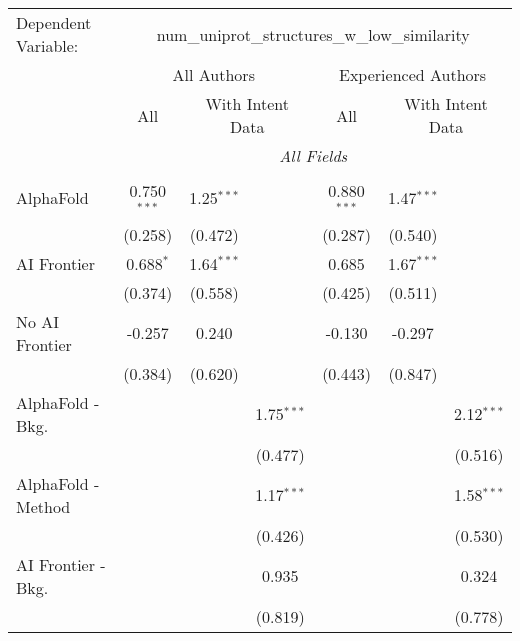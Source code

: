 \begingroup
\centering
\begin{tabular}{lcccccc}
   \tabularnewline \midrule \midrule
   Dependent Variable: & \multicolumn{6}{c}{num\_uniprot\_structures\_w\_low\_similarity}\\
 & \multicolumn{3}{c}{All Authors} & \multicolumn{3}{c}{Experienced Authors} \\
\cmidrule(lr){2-4} \cmidrule(lr){5-7}
 & \multicolumn{1}{c}{All} & \multicolumn{2}{c}{With Intent Data} & \multicolumn{1}{c}{All} & \multicolumn{2}{c}{With Intent Data} \\
\cmidrule(lr){2-2} \cmidrule(lr){3-4} \cmidrule(lr){5-5} \cmidrule(lr){6-7}
 & \multicolumn{6}{c}{\textit{All Fields}} \\ \\
   AlphaFold               & 0.750$^{***}$ & 1.25$^{***}$ &              & 0.880$^{***}$ & 1.47$^{***}$ &   \\   
                           & (0.258)       & (0.472)      &              & (0.287)       & (0.540)      &   \\   
   AI Frontier             & 0.688$^{*}$   & 1.64$^{***}$ &              & 0.685         & 1.67$^{***}$ &   \\   
                           & (0.374)       & (0.558)      &              & (0.425)       & (0.511)      &   \\   
   No AI Frontier          & -0.257        & 0.240        &              & -0.130        & -0.297       &   \\   
                           & (0.384)       & (0.620)      &              & (0.443)       & (0.847)      &   \\   
   AlphaFold - Bkg.        &               &              & 1.75$^{***}$ &               &              & 2.12$^{***}$\\   
                           &               &              & (0.477)      &               &              & (0.516)\\   
   AlphaFold - Method      &               &              & 1.17$^{***}$ &               &              & 1.58$^{***}$\\   
                           &               &              & (0.426)      &               &              & (0.530)\\   
   AI Frontier - Bkg.      &               &              & 0.935        &               &              & 0.324\\   
                           &               &              & (0.819)      &               &              & (0.778)\\   

\end{tabular}
